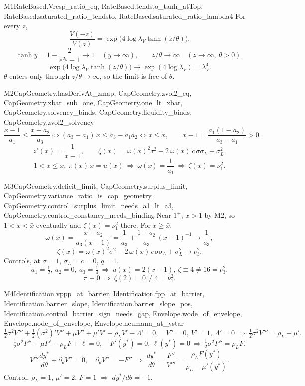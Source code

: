 \begin{mproof}{M1}{RateBased.Vresp_ratio_eq, RateBased.tendsto_tanh_atTop, RateBased.saturated_ratio_tendsto, RateBased.saturated_ratio_lambda4}
For every $z$,
\[ \frac{V(-z)}{V(z)}=\exp\big(4\log\lambda_V\tanh(z/\theta)\big). \]
\[ \tanh y=1-\frac{2}{e^{2y}+1}\to1\quad(y\to\infty),\qquad z/\theta\to\infty\quad(z\to\infty,\ \theta>0). \]
\[ \exp\big(4\log\lambda_V\tanh(z/\theta)\big)\to\exp(4\log\lambda_V)=\lambda_V^4 . \]
$\theta$ enters only through $z/\theta\to\infty$, so the limit is free of $\theta$.
\end{mproof}

\begin{mproof}{M2}{CapGeometry.hasDerivAt_zmap, CapGeometry.zvol2_eq, CapGeometry.xbar_sub_one, CapGeometry.one_lt_xbar, CapGeometry.solvency_binds, CapGeometry.liquidity_binds, CapGeometry.zvol2_solvency}
\[ \frac{x-1}{a_1}\le\frac{x-a_2}{a_3}\iff(a_3-a_1)\,x\le a_3-a_1a_2\iff x\le\bar x,\qquad \bar x-1=\frac{a_1(1-a_2)}{a_3-a_1}>0 . \]
\[ z'(x)=\frac{1}{x-1},\qquad \zeta(x)=\omega(x)^2\sigma^2-2\,\omega(x)\,c\,\sigma\sigma_L+\sigma_L^2 . \]
\[ 1<x\le\bar x,\ \pi(x)\,x=u(x)\ \Rightarrow\ \omega(x)=\frac{1}{a_1}\ \Rightarrow\ \zeta(x)=\nu_1^2. \]
\end{mproof}

\begin{mproof}{M3}{CapGeometry.deficit_limit, CapGeometry.surplus_limit, CapGeometry.variance_ratio_is_cap_geometry, CapGeometry.control_surplus_limit_needs_a1_lt_a3, CapGeometry.control_constancy_needs_binding}
Near $1^+$, $\bar x>1$ by M2, so $1<x<\bar x$ eventually and $\zeta(x)=\nu_1^2$ there.
For $x\ge\bar x$,
\[ \omega(x)=\frac{x-a_2}{a_3(x-1)}=\frac{1}{a_3}+\frac{1-a_2}{a_3}\,(x-1)^{-1}\to\frac{1}{a_3}, \]
\[ \zeta(x)=\omega(x)^2\sigma^2-2\,\omega(x)\,c\,\sigma\sigma_L+\sigma_L^2\to\nu_3^2 . \]
Controls, at $\sigma=1$, $\sigma_L=c=0$, $q=1$.
\[ a_1=\tfrac12,\ a_2=0,\ a_3=\tfrac14\ \Rightarrow\ u(x)=2(x-1),\ \zeta\equiv4\ne16=\nu_3^2. \]
\[ \pi\equiv0\ \Rightarrow\ \zeta(2)=0\ne4=\nu_1^2. \]
\end{mproof}

\begin{mproof}{M4}{Identification.vppp_at_barrier, Identification.fpp_at_barrier, Identification.barrier_slope, Identification.barrier_slope_pos, Identification.control_barrier_sign_needs_gap, Envelope.wode_of_envelope, Envelope.node_of_envelope, Envelope.neumann_at_ystar}
\[ \tfrac12\sigma^2V'''+\tfrac12(\sigma^2)'V''+\mu V''+\mu'V'-\rho_LV'-\Lambda'=0,\quad V''=0,\ V'=1,\ \Lambda'=0\ \Rightarrow\ \tfrac12\sigma^2V'''=\rho_L-\mu' . \]
\[ \tfrac12\sigma^2F''+\mu F'-\rho_LF+\ell=0,\quad F'(y^*)=0,\ \ell(y^*)=0\ \Rightarrow\ \tfrac12\sigma^2F''=\rho_LF . \]
\[ V'''\frac{dy^*}{d\theta}+\partial_\theta V''=0,\quad \partial_\theta V''=-F''\ \Rightarrow\ \frac{dy^*}{d\theta}=\frac{F''}{V'''}=\frac{\rho_LF(y^*)}{\rho_L-\mu'(y^*)} . \]
Control, $\rho_L=1$, $\mu'=2$, $F=1$ $\Rightarrow$ $dy^*/d\theta=-1$.
\end{mproof}

